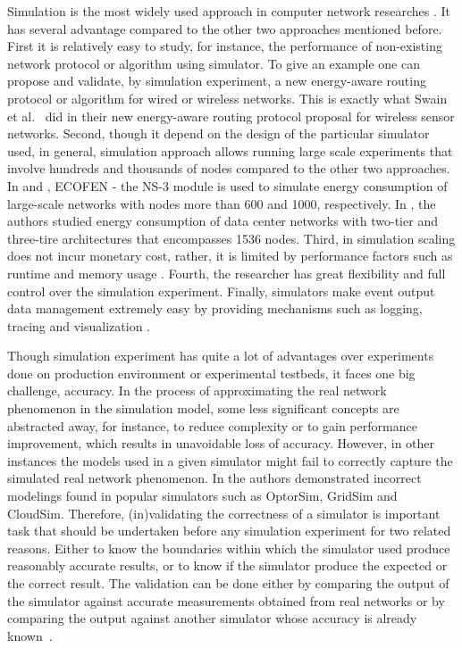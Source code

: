 Simulation is the most widely used approach in computer network researches \cite{DBLP:conf/icc/WeingartnerLW09}. It has several advantage compared to the other two approaches mentioned before. First it is relatively easy to study, for instance, the performance of non-existing network protocol or algorithm using simulator. To give an example one can propose and validate, by simulation experiment, a new energy-aware routing protocol or algorithm for wired or wireless networks. This is exactly what Swain et al.{\ }\cite{DBLP:conf/aina/SwainHC10} did in their new energy-aware routing protocol proposal for wireless sensor networks. Second, though it depend on the design of the particular simulator used, in general, simulation approach allows running large scale experiments that involve hundreds and thousands of nodes compared to the other two approaches. In \cite{DBLP:conf/wowmom/OrgerieLLL11} and \cite{DBLP:conf/cloudnet/CorneaOL14}, ECOFEN - the NS-3 module is used to simulate energy consumption of large-scale networks with nodes more than 600 and 1000, respectively. In \cite{DBLP:journals/tjs/KliazovichBK12}, the authors studied energy consumption of data center networks with two-tier and three-tire architectures that encompasses 1536 nodes. Third, in simulation scaling does not incur monetary cost, rather, it is limited by performance factors such as runtime and memory usage \cite{DBLP:conf/icc/WeingartnerLW09}. Fourth, the researcher has great flexibility and full control over the simulation experiment. Finally, simulators make event output data management extremely easy by providing mechanisms such as logging, tracing and visualization \cite{ns3,DBLP:journals/jpdc/CasanovaGLQS14}.  

Though simulation experiment has quite a lot of advantages over experiments done on production environment or experimental testbeds, it faces one big challenge, accuracy. In the process of approximating the real network phenomenon in the simulation model, some less significant concepts are abstracted away, for instance, to reduce complexity or to gain performance improvement, which results in unavoidable loss of accuracy. However, in other instances the models used in a given simulator might fail to correctly capture the simulated real network phenomenon. In \cite{DBLP:journals/tomacs/VelhoSCL13} the authors demonstrated incorrect modelings found in popular simulators such as OptorSim, GridSim and CloudSim. Therefore, (in)validating the correctness of a simulator is important task that should be undertaken before any simulation experiment for two related reasons. Either to know the boundaries within which the simulator used produce reasonably accurate results, or to know if the simulator produce the expected or the correct result. The validation can be done either by comparing the output of the simulator against accurate measurements obtained from real networks or by comparing the output against another simulator whose accuracy is already known~\cite{DBLP:books/daglib/0076234}.


